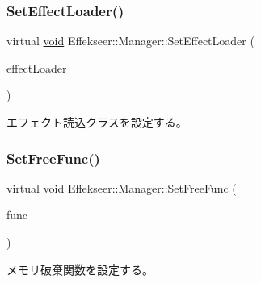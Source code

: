 \subsubsection{\texorpdfstring{Set\+Effect\+Loader()}{SetEffectLoader()}}
{\footnotesize\ttfamily virtual \mbox{\hyperlink{namespace_effekseer_ab34c4088e512200cf4c2716f168deb56}{void}} Effekseer\+::\+Manager\+::\+Set\+Effect\+Loader (\begin{DoxyParamCaption}\item[{\mbox{\hyperlink{class_effekseer_1_1_effect_loader}{Effect\+Loader}} $\ast$}]{effect\+Loader }\end{DoxyParamCaption})\hspace{0.3cm}{\ttfamily [pure virtual]}}



エフェクト読込クラスを設定する。 

\mbox{\label{class_effekseer_1_1_manager_a81402561ce17b0d4c681811affbd7340}} 
\subsubsection{\texorpdfstring{Set\+Free\+Func()}{SetFreeFunc()}}
{\footnotesize\ttfamily virtual \mbox{\hyperlink{namespace_effekseer_ab34c4088e512200cf4c2716f168deb56}{void}} Effekseer\+::\+Manager\+::\+Set\+Free\+Func (\begin{DoxyParamCaption}\item[{Free\+Func}]{func }\end{DoxyParamCaption})\hspace{0.3cm}{\ttfamily [pure virtual]}}



メモリ破棄関数を設定する。 

\mbox{\label{class_effekseer_1_1_manager_aa35fc7968dadeb82e58bb0c472dfb8b1}} 
